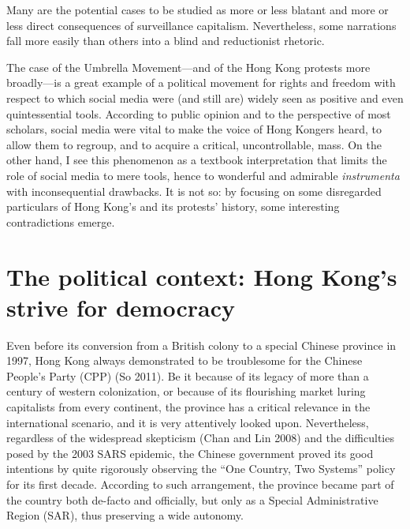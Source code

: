 \documentclass[
  a4paper,
]{book}
\begin{document}
Many are the potential cases to be studied as more or less blatant and more or less direct consequences of surveillance capitalism. Nevertheless, some narrations fall more easily than others into a blind and reductionist rhetoric.

The case of the Umbrella Movement---and of the Hong Kong protests more broadly---is a great example of a political movement for rights and freedom with respect to which social media were (and still are) widely seen as positive and even quintessential tools. According to public opinion and to the perspective of most scholars, social media were vital to make the voice of Hong Kongers heard, to allow them to regroup, and to acquire a critical, uncontrollable, mass. On the other hand, I see this phenomenon as a textbook interpretation that limits the role of social media to mere tools, hence to wonderful and admirable \emph{instrumenta} with inconsequential drawbacks. It is not so: by focusing on some disregarded particulars of Hong Kong's and its protests' history, some interesting contradictions emerge.

\hypertarget{the-political-context-hong-kongs-strive-for-democracy}{%
\section{The political context: Hong Kong's strive for democracy}\label{the-political-context-hong-kongs-strive-for-democracy}}

Even before its conversion from a British colony to a special Chinese province in 1997, Hong Kong always demonstrated to be troublesome for the Chinese People's Party (CPP) {(So 2011)}. Be it because of its legacy of more than a century of western colonization, or because of its flourishing market luring capitalists from every continent, the province has a critical relevance in the international scenario, and it is very attentively looked upon. Nevertheless, regardless of the widespread skepticism {(Chan and Lin 2008)} and the difficulties posed by the 2003 SARS epidemic, the Chinese government proved its good intentions by quite rigorously observing the ``One Country, Two Systems'' policy for its first decade. According to such arrangement, the province became part of the country both de-facto and officially, but only as a Special Administrative Region (SAR), thus preserving a wide autonomy.
\end{document}
